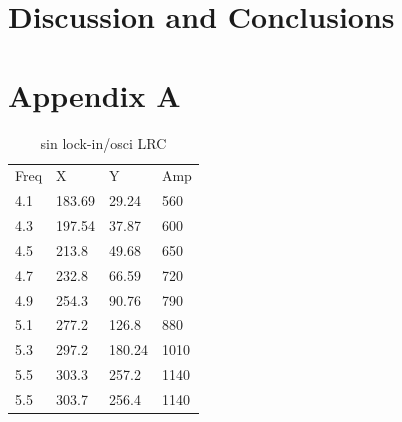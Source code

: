 \documentclass[12pt]{article}
\begin{document}
    \section{Discussion and Conclusions}
    
    
    
    
    
    
    
    
    
    
    \newpage
    \section*{Appendix A}
        
    \begin{table}[h]
    \centering
        \begin{tabular}{llll}
        Freq & X      & Y      & Amp \\
        4.1  & 183.69 & 29.24  & 560 \\
        4.3  & 197.54 & 37.87  & 600 \\
        4.5  & 213.8  & 49.68  & 650 \\
        4.7  & 232.8  & 66.59  & 720 \\
        4.9  & 254.3  & 90.76  & 790 \\
        5.1  & 277.2  & 126.8  & 880 \\
        5.3  & 297.2  & 180.24 & 1010\\
        5.5  & 303.3  & 257.2  & 1140\\
        5.5  & 303.7  & 256.4  & 1140\\
        \end{tabular}
        \caption{sin lock-in/osci LRC}
        \label{tab:lock_in_LRC}
    \end{table}
    
    
    
\end{document}
